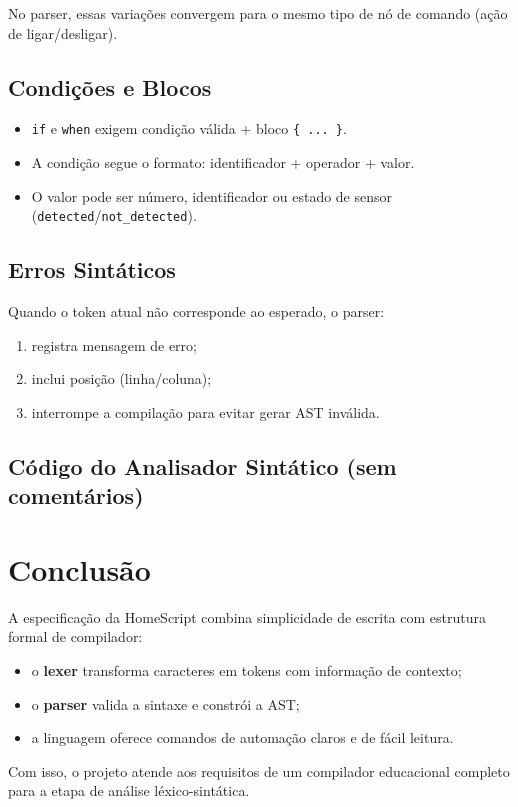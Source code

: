 \documentclass[12pt,a4paper]{article}
\begin{document}
No parser, essas variações convergem para o mesmo tipo de nó de comando (ação de ligar/desligar).

\subsection{Condições e Blocos}
\begin{itemize}
  \item \texttt{if} e \texttt{when} exigem condição válida + bloco \texttt{\{ ... \}}.
  \item A condição segue o formato: identificador + operador + valor.
  \item O valor pode ser número, identificador ou estado de sensor (\texttt{detected}/\texttt{not\_detected}).
\end{itemize}

\subsection{Erros Sintáticos}
Quando o token atual não corresponde ao esperado, o parser:
\begin{enumerate}[label=\arabic*.]
  \item registra mensagem de erro;
  \item inclui posição (linha/coluna);
  \item interrompe a compilação para evitar gerar AST inválida.
\end{enumerate}

\subsection{Código do Analisador Sintático (sem comentários)}


\section{Conclusão}
A especificação da HomeScript combina simplicidade de escrita com estrutura formal de compilador:
\begin{itemize}
  \item o \textbf{lexer} transforma caracteres em tokens com informação de contexto;
  \item o \textbf{parser} valida a sintaxe e constrói a AST;
  \item a linguagem oferece comandos de automação claros e de fácil leitura.
\end{itemize}

Com isso, o projeto atende aos requisitos de um compilador educacional completo para a etapa de análise léxico-sintática.
\end{document}
